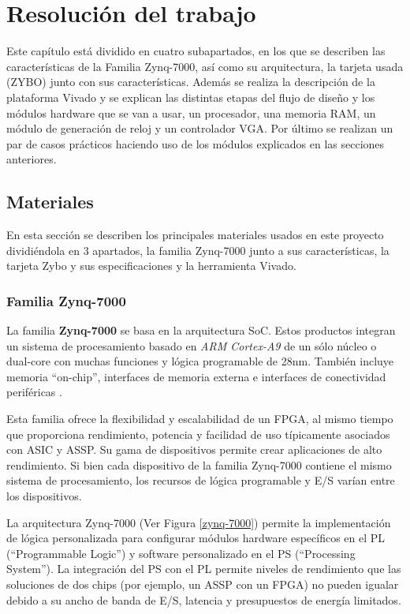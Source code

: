 
\chapter{Resolución del trabajo}
 
Este capítulo está dividido en cuatro subapartados, en los que se describen las características de la Familia Zynq-7000, así 
como su arquitectura, la tarjeta usada (ZYBO) junto con sus características. Además se realiza la descripción de la plataforma Vivado y se explican las 
distintas etapas del flujo de diseño y los módulos hardware que se van a usar, un procesador, una memoria RAM, un módulo de generación de reloj y 
un controlador VGA. Por último se realizan un par de casos prácticos haciendo uso de los módulos explicados en las secciones anteriores. 

\section{Materiales}

En esta sección se describen los principales materiales usados en este proyecto dividiéndola en 3 apartados, la familia Zynq-7000 junto a sus 
características, la tarjeta Zybo y sus especificaciones y la herramienta Vivado.

\subsection{Familia Zynq-7000}

La familia \textbf{Zynq-7000} se basa en la arquitectura SoC. Estos productos integran un sistema de procesamiento basado en \textit{ARM Cortex-A9} 
de un sólo núcleo o dual-core con muchas funciones y lógica programable de 28nm. También incluye memoria ``on-chip'', interfaces de memoria externa e 
interfaces de conectividad periféricas \cite{zynq7000}.

Esta familia ofrece la flexibilidad y escalabilidad de un FPGA, al mismo tiempo que proporciona rendimiento, potencia y facilidad de uso típicamente 
asociados con ASIC y ASSP. Su gama de dispositivos permite crear aplicaciones de alto rendimiento. Si bien cada dispositivo de la familia Zynq-7000 
contiene el mismo sistema de procesamiento, los recursos de lógica programable y E/S varían entre los dispositivos.

La arquitectura Zynq-7000 (Ver Figura \ref{zynq-7000}) permite la implementación de lógica personalizada para configurar módulos hardware específicos 
en el PL (``Programmable Logic'') y software personalizado en el PS (``Processing System''). La integración del PS con el PL 
permite niveles de rendimiento que las soluciones de dos chips (por ejemplo, un ASSP con un FPGA) no pueden igualar debido a su ancho de banda de E/S, 
latencia y presupuestos de energía limitados.

